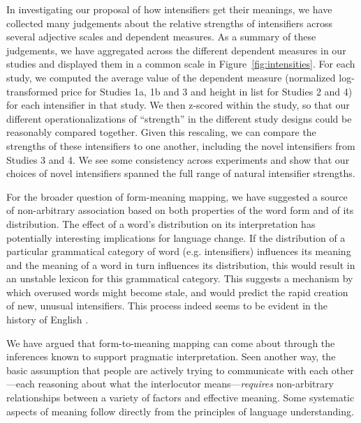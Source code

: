 \documentclass[10pt,letterpaper]{article}
\newcommand{\ndg}[1]{{\color{green}#1}}
\begin{document}
In investigating our proposal of how intensifiers get their meanings, we have collected many judgements about the relative strengths of intensifiers across several adjective scales and dependent measures.
As a summary of these judgements, we have aggregated across the different dependent measures in our studies and displayed them in a common scale in Figure~\ref{fig:intensities}.
For each study, we computed the average value of the dependent measure (normalized log-transformed price for Studies 1a, 1b and 3 and height in list for Studies 2 and 4) for each intensifier in that study. We then z-scored within the study, so that our different operationalizations of ``strength'' in the different study designs could be reasonably compared together.
Given this rescaling, we can compare the strengths of these intensifiers to one another, including the novel intensifiers from Studies 3 and 4.
We see some consistency across experiments and show that our choices of novel intensifiers spanned the full range of natural intensifier strengths.

For the broader question of form-meaning mapping, we have suggested a source of non-arbitrary association based on both properties of the word form and of its distribution.
The effect of a word's distribution on its interpretation has potentially interesting implications for language change.
If the distribution of a particular grammatical category of word (e.g. intensifiers) influences its meaning and the meaning of a word in turn influences its distribution, this would result in an unstable lexicon for this grammatical category.
This suggests a mechanism by which overused words might become stale, and would predict the rapid creation of new, unusual intensifiers.
This process indeed seems to be evident in the history of English \cite{bolinger_degree_1972}.

We have argued that form-to-meaning mapping can come about through the inferences known to support pragmatic interpretation.
Seen another way, the basic assumption that people are actively trying to communicate with each other---each reasoning about what the interlocutor means---\emph{requires} non-arbitrary relationships between a variety of factors and effective meaning.
Some systematic aspects of meaning follow directly from the principles of language understanding.
\end{document}
